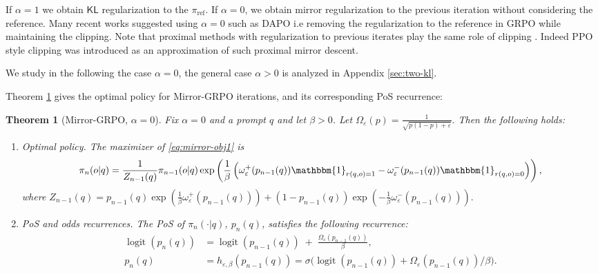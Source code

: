 \documentclass[11pt,reqno]{amsart}
\newtheorem{theorem}{Theorem}
\DeclareMathOperator{\logit}{logit}
\begin{document}
If $\alpha=1$ we obtain $\mathsf{KL}$ regularization to the $\pi_{\mathrm{ref}}$. If $\alpha=0$, we obtain mirror regularization to the previous iteration without considering the reference. Many  recent works suggested using $\alpha=0$ such as DAPO \citep{yu2025dapoopensourcellmreinforcement} i.e removing the regularization to the reference in GRPO while maintaining the clipping.  Note that proximal methods with regularization to previous iterates play the same role of clipping \citep{tomar2021mirrordescentpolicyoptimization,gunter2024appleintelligencefoundationlanguage}. Indeed PPO style clipping \citep{schulman2017proximal} was introduced as an approximation of such  proximal mirror descent.

We study in the following the case $\alpha=0$, the general case $\alpha>0$ is analyzed in Appendix \ref{sec:two-kl}.

Theorem \ref{theo:mirropolicy} gives the optimal policy for Mirror-GRPO iterations, and its corresponding PoS recurrence: 

\begin{theorem}[Mirror-GRPO, $\alpha=0$]\label{theo:mirropolicy}
\label{thm:mirror-only}
Fix $\alpha=0$ and a prompt $q$ and let $\beta>0$.
Let $\Omega_\varepsilon(p)= \frac{1}{\sqrt{p(1-p)+\varepsilon}}.$ Then the following holds:
\begin{enumerate}[leftmargin=1.1em, itemsep=4pt, topsep=4pt]

\item\emph{Optimal policy.}
The maximizer of \eqref{eq:mirror-obj1} is
\[ \pi_{n}(o|q)  = \frac{1}{Z_{n-1}(q)}\pi_{n-1}(o|q) \exp \left(\frac{1}{\beta} \left( \omega^+_{\varepsilon}(p_{n-1}(q)) \mathbbm{1}_{r(q,o)=1}  - \omega^-_{\varepsilon}(p_{n-1}(q))   \mathbbm{1}_{r(q,o)=0} \right) \right),  \]
where 
$ Z_{n-1}(q) = p_{n-1}(q) \exp \left(\frac{1}{\beta} \omega^+_{\varepsilon}(p_{n-1}(q))   \right) +  (1-p_{n-1}(q))  \exp \left(- \frac{1}{\beta} \omega^-_{\varepsilon} (p_{n-1} (q)) \right) .$

\item\emph{PoS and odds recurrences.} The PoS of $\pi_{n}(\cdot|q)$, $p_{n}(q)$, satisfies  the following recurrence: 
\begin{align}
\logit(p_n(q))
&=\logit(p_{n-1}(q))\;+\;\frac{\Omega_\varepsilon(p_{n-1}(q))}{\beta},\\
p_n(q)
&=h_{\varepsilon,\beta}(p_{n-1}(q))=\sigma\!\Big(\logit(p_{n-1}(q))+\Omega_\varepsilon(p_{n-1}(q))/\beta\Big).
\label{eq:posmirror}
\end{align}
\end{enumerate}
\end{theorem}
\end{document}
